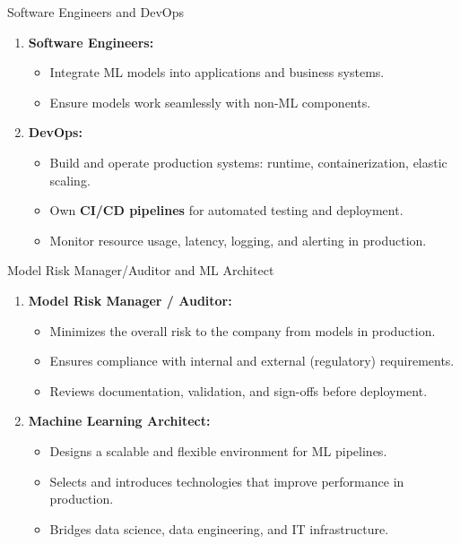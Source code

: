 \begin{frame}{Software Engineers and DevOps}
\begin{enumerate}
\item<1-> \textbf{Software Engineers:}
    \begin{itemize}
    \item Integrate ML models into applications and business systems.
    \item Ensure models work seamlessly with non-ML components.
    \end{itemize}
\item<2-> \textbf{DevOps:}
    \begin{itemize}
    \item Build and operate production systems: runtime, containerization, elastic scaling.
    \item Own \textbf{CI/CD pipelines} for automated testing and deployment.
    \item Monitor resource usage, latency, logging, and alerting in production.
    \end{itemize}
\end{enumerate}
\end{frame}

\begin{frame}{Model Risk Manager/Auditor and ML Architect}
\begin{enumerate}
\item<1-> \textbf{Model Risk Manager / Auditor:}
    \begin{itemize}
    \item Minimizes the overall risk to the company from models in production.
    \item Ensures compliance with internal and external (regulatory) requirements.
    \item Reviews documentation, validation, and sign-offs before deployment.
    \end{itemize}
\item<2-> \textbf{Machine Learning Architect:}
    \begin{itemize}
    \item Designs a scalable and flexible environment for ML pipelines.
    \item Selects and introduces technologies that improve performance in production.
    \item Bridges data science, data engineering, and IT infrastructure.
    \end{itemize}
\end{enumerate}
\end{frame}


